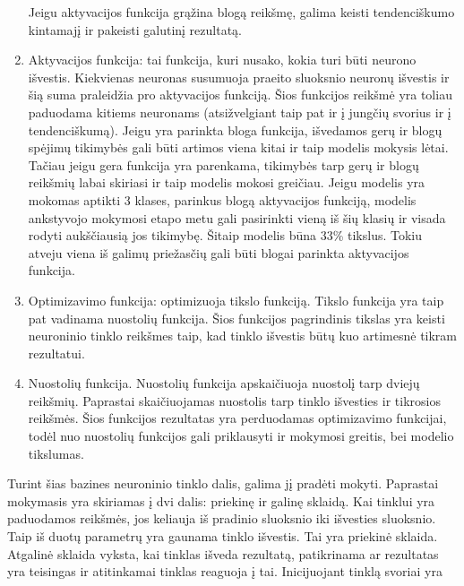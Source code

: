 \documentclass{VUMIFInfKursinis}
\begin{document}
\begin{enumerate}
  Jeigu aktyvacijos funkcija grąžina blogą reikšmę, galima keisti tendenciškumo kintamajį ir
  pakeisti galutinį rezultatą.
  \item Aktyvacijos funkcija: tai funkcija, kuri nusako, kokia turi būti neurono išvestis. Kiekvienas neuronas
  susumuoja praeito sluoksnio neuronų išvestis ir šią suma praleidžia pro aktyvacijos funkciją.
  Šios funkcijos reikšmė yra toliau paduodama kitiems neuronams (atsižvelgiant taip pat ir į
  jungčių svorius ir į tendenciškumą).
    Jeigu yra parinkta bloga funkcija, išvedamos gerų ir blogų spėjimų tikimybės gali būti artimos viena kitai ir taip modelis mokysis lėtai. Tačiau jeigu gera funkcija yra parenkama, tikimybės tarp gerų ir blogų reikšmių labai skiriasi ir taip modelis mokosi greičiau.
    Jeigu modelis yra mokomas aptikti 3 klases, parinkus blogą aktyvacijos
    funkciją, modelis ankstyvojo mokymosi etapo metu gali pasirinkti vieną
    iš šių klasių ir visada rodyti aukščiausią jos tikimybę. Šitaip modelis būna 33\% tikslus. Tokiu atveju viena iš galimų priežasčių gali būti blogai parinkta aktyvacijos funkcija. 
  \item Optimizavimo funkcija: optimizuoja tikslo funkciją. Tikslo funkcija yra taip pat vadinama nuostolių funkcija.
  Šios funkcijos pagrindinis tikslas yra keisti neuroninio tinklo reikšmes taip, kad tinklo išvestis būtų
  kuo artimesnė tikram rezultatui.
  \item Nuostolių funkcija. Nuostolių funkcija apskaičiuoja nuostolį tarp dviejų reikšmių. Paprastai skaičiuojamas nuostolis tarp tinklo išvesties ir tikrosios reikšmės. Šios funkcijos rezultatas yra perduodamas optimizavimo funkcijai, todėl nuo nuostolių funkcijos gali priklausyti ir mokymosi greitis, bei modelio tikslumas.
\end{enumerate}
\par
Turint šias bazines neuroninio tinklo dalis, galima jį pradėti mokyti. Paprastai mokymasis
yra skiriamas į dvi dalis: priekinę ir galinę sklaidą.
Kai tinklui yra paduodamos reikšmės, jos keliauja iš pradinio sluoksnio iki išvesties sluoksnio. Taip iš duotų parametrų yra gaunama tinklo išvestis. Tai
yra priekinė sklaida.
Atgalinė sklaida vyksta, kai tinklas išveda rezultatą, patikrinama ar
rezultatas yra teisingas ir atitinkamai tinklas reaguoja į tai. Inicijuojant tinklą svoriai yra
\end{document}
